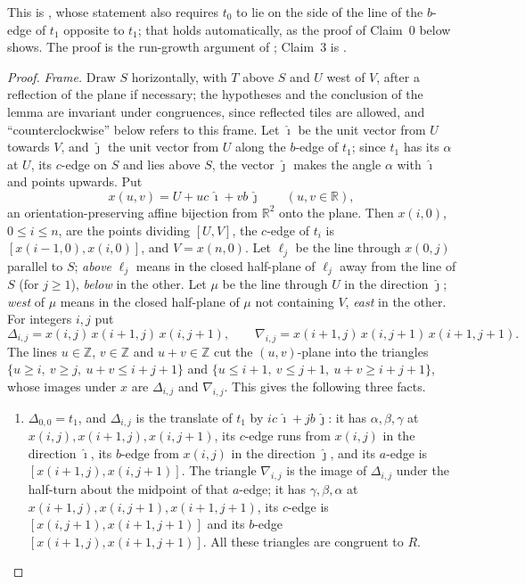 \documentclass[11pt]{amsart}
\theoremstyle{remark}
\newcommand{\Z}{\mathbb{Z}}
\newcommand{\R}{\mathbb{R}}
\begin{document}
This is \cite[Lemma~33]{BR}, whose statement also requires $t_0$ to lie on the side of the line of the $b$-edge of $t_1$ opposite to $t_1$; that holds automatically, as the proof of Claim~0 below shows. The proof is the run-growth argument of \cite[Lemmas~32 and~33]{BR}; Claim~3 is \cite[Lemma~32]{BR}.

\begin{proof}
\emph{Frame.} Draw $S$ horizontally, with $T$ above $S$ and $U$ west of $V$, after a reflection of the plane if necessary; the hypotheses and the conclusion of the lemma are invariant under congruences, since reflected tiles are allowed, and ``counterclockwise'' below refers to this frame. Let $\hat\imath$ be the unit vector from $U$ towards $V$, and $\hat\jmath$ the unit vector from $U$ along the $b$-edge of $t_1$; since $t_1$ has its $\alpha$ at $U$, its $c$-edge on $S$ and lies above $S$, the vector $\hat\jmath$ makes the angle $\alpha$ with $\hat\imath$ and points upwards. Put
\[
x(u,v)=U+uc\,\hat\imath+vb\,\hat\jmath\qquad(u,v\in\R),
\]
an orientation-preserving affine bijection from $\R^2$ onto the plane. Then $x(i,0)$, $0\le i\le n$, are the points dividing $[U,V]$, the $c$-edge of $t_i$ is $[x(i-1,0),x(i,0)]$, and $V=x(n,0)$. Let $\ell_j$ be the line through $x(0,j)$ parallel to $S$; \emph{above} $\ell_j$ means in the closed half-plane of $\ell_j$ away from the line of $S$ (for $j\ge1$), \emph{below} in the other. Let $\mu$ be the line through $U$ in the direction $\hat\jmath$; \emph{west} of $\mu$ means in the closed half-plane of $\mu$ not containing $V$, \emph{east} in the other. For integers $i,j$ put
\[
\Delta_{i,j}=x(i,j)\,x(i{+}1,j)\,x(i,j{+}1),\qquad
\nabla_{i,j}=x(i{+}1,j)\,x(i,j{+}1)\,x(i{+}1,j{+}1).
\]
The lines $u\in\Z$, $v\in\Z$ and $u+v\in\Z$ cut the $(u,v)$-plane into the triangles $\{u\ge i,\ v\ge j,\ u+v\le i+j+1\}$ and $\{u\le i+1,\ v\le j+1,\ u+v\ge i+j+1\}$, whose images under $x$ are $\Delta_{i,j}$ and $\nabla_{i,j}$. This gives the following three facts.
\begin{enumerate}
\item[(Q1)] $\Delta_{0,0}=t_1$, and $\Delta_{i,j}$ is the translate of $t_1$ by $ic\,\hat\imath+jb\,\hat\jmath$: it has $\alpha,\beta,\gamma$ at $x(i,j),x(i{+}1,j),x(i,j{+}1)$, its $c$-edge runs from $x(i,j)$ in the direction $\hat\imath$, its $b$-edge from $x(i,j)$ in the direction $\hat\jmath$, and its $a$-edge is $[x(i{+}1,j),x(i,j{+}1)]$. The triangle $\nabla_{i,j}$ is the image of $\Delta_{i,j}$ under the half-turn about the midpoint of that $a$-edge; it has $\gamma,\beta,\alpha$ at $x(i{+}1,j),x(i,j{+}1),x(i{+}1,j{+}1)$, its $c$-edge is $[x(i,j{+}1),x(i{+}1,j{+}1)]$ and its $b$-edge $[x(i{+}1,j),x(i{+}1,j{+}1)]$. All these triangles are congruent to $R$.

\end{enumerate}
\end{proof}
\end{document}
